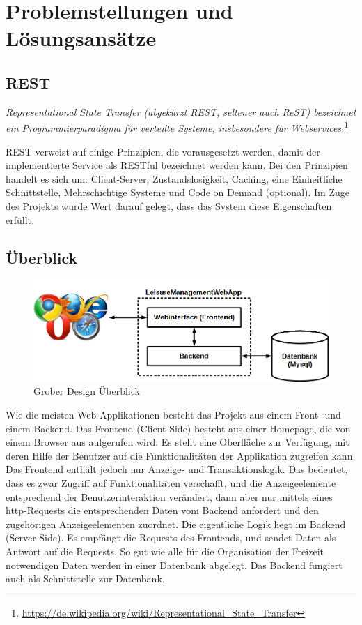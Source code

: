 \section{Problemstellungen und Lösungsansätze}

\subsection{REST}
\textit{Representational State Transfer (abgekürzt REST, seltener auch ReST) bezeichnet ein Programmierparadigma für verteilte Systeme, insbesondere für Webservices.}\vspace{5mm}\footnote{\url{https://de.wikipedia.org/wiki/Representational_State_Transfer}}

REST verweist auf einige Prinzipien, die vorausgesetzt werden, damit der implementierte Service als RESTful bezeichnet werden kann. Bei den Prinzipien handelt es sich um: Client-Server, Zustandslosigkeit, Caching, eine Einheitliche Schnittstelle, Mehrschichtige Systeme und Code on Demand (optional). Im Zuge des Projekts wurde Wert darauf gelegt, dass das System diese Eigenschaften erfüllt.

\subsection{Überblick}

\begin{figure}[h]
	\centering
	\includegraphics[width=0.7\linewidth]{2_solutions/pics/overview}
	\caption{Grober Design Überblick}
	\label{fig:overview}
\end{figure}

Wie die meisten Web-Applikationen besteht das Projekt aus einem Front- und einem Backend. Das Frontend (Client-Side) besteht aus einer Homepage, die von einem Browser aus aufgerufen wird. Es stellt eine Oberfläche zur Verfügung, mit deren Hilfe der Benutzer auf die Funktionalitäten der Applikation zugreifen kann. Das Frontend enthält jedoch nur Anzeige- und Transaktionslogik. Das bedeutet, dass es zwar Zugriff auf Funktionalitäten verschafft, und die Anzeigeelemente entsprechend der Benutzerinteraktion verändert, dann aber nur mittels eines http-Requests die entsprechenden Daten vom Backend anfordert und den zugehörigen Anzeigeelementen zuordnet. Die eigentliche Logik liegt im Backend (Server-Side). Es empfängt die Requests des Frontends, und sendet Daten als Antwort auf die Requests. So gut wie alle für die Organisation der Freizeit notwendigen Daten werden in einer Datenbank abgelegt. Das Backend fungiert auch als Schnittstelle zur Datenbank.   

